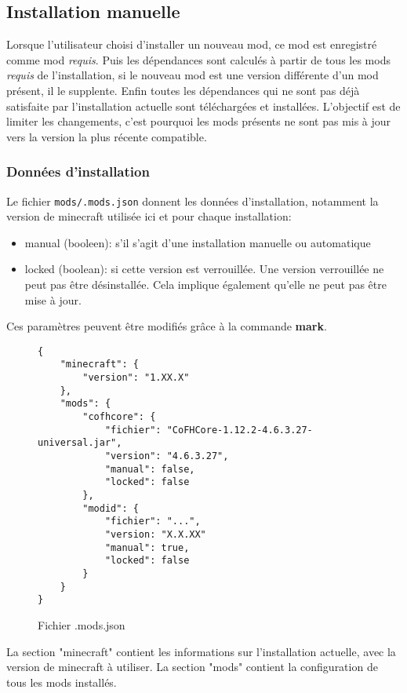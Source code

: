 \documentclass{article}
\begin{document}
\subsection{Installation manuelle}
\label{section:utilisation.manuelle}
Lorsque l'utilisateur choisi d'installer un nouveau mod, ce mod est enregistré comme mod \textit{requis}.
Puis les dépendances sont calculés à partir de tous les mods \textit{requis} de l'installation, si le nouveau mod est une version différente d'un mod présent, il le supplente.
Enfin toutes les dépendances qui ne sont pas déjà satisfaite par l'installation actuelle sont téléchargées et installées.
L'objectif est de limiter les changements, c'est pourquoi les mods présents ne sont pas mis à jour vers la version la plus récente compatible.

\subsubsection{Données d'installation}
Le fichier \texttt{mods/.mods.json} donnent les données d'installation, notamment la version de minecraft utilisée ici et pour chaque installation:
\begin{itemize}
    \item manual (booleen): s'il s'agit d'une installation manuelle ou automatique
    \item locked (boolean): si cette version est verrouillée.
        Une version verrouillée ne peut pas être désinstallée.
        Cela implique également qu'elle ne peut pas être mise à jour.
\end{itemize}

Ces paramètres peuvent être modifiés grâce à la commande \textbf{mark}.

\begin{figure}
\begin{verbatim}
{
    "minecraft": {
		"version": "1.XX.X"
    },
    "mods": {
        "cofhcore": {
            "fichier": "CoFHCore-1.12.2-4.6.3.27-universal.jar",
            "version": "4.6.3.27",
            "manual": false,
            "locked": false
        },
        "modid": {
            "fichier": "...",
            "version: "X.X.XX"
            "manual": true,
            "locked": false
        }
	}
}
\end{verbatim}
\caption{Fichier .mods.json}
\end{figure}

La section "minecraft" contient les informations sur l'installation actuelle, avec la version de minecraft à utiliser.
La section "mods" contient la configuration de tous les mods installés.
\end{document}
